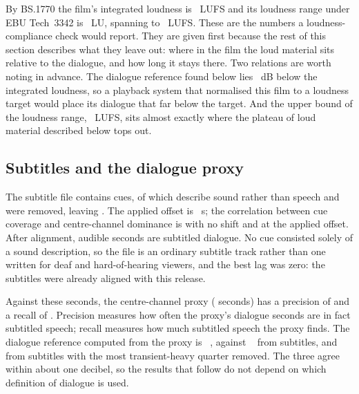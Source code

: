 By BS.1770 the film's integrated loudness is \resIntegrated~LUFS and its loudness range under EBU Tech~3342 is \resLRA~LU, spanning \resLRALow{} to \resLRAHigh~LUFS. These are the numbers a loudness-compliance check would report. They are given first because the rest of this section describes what they leave out: where in the film the loud material sits relative to the dialogue, and how long it stays there. Two relations are worth noting in advance. The dialogue reference found below lies \xDialogueBelowIntegrated~dB below the integrated loudness, so a playback system that normalised this film to a loudness target would place its dialogue that far below the target. And the upper bound of the loudness range, \resLRAHigh~LUFS, sits almost exactly where the plateau of loud material described below tops out.

\subsection{Subtitles and the dialogue proxy}

The subtitle file contains \resSubCues{} cues, of which \resSubNonspeechCues{} describe sound rather than speech and were removed, leaving \resSubSpeechCues. The applied offset is \resSubOffset~s; the correlation between cue coverage and centre-channel dominance is \resSubCorrZero{} with no shift and \resSubCorrOffset{} at the applied offset. After alignment, \resSubSeconds{} audible seconds are subtitled dialogue. No cue consisted solely of a sound description, so the file is an ordinary subtitle track rather than one written for deaf and hard-of-hearing viewers, and the best lag was zero: the subtitles were already aligned with this release.

Against these seconds, the centre-channel proxy (\resProxySeconds{} seconds) has a precision of \resProxyPrecision{} and a recall of \resProxyRecall. Precision measures how often the proxy's dialogue seconds are in fact subtitled speech; recall measures how much subtitled speech the proxy finds. The dialogue reference computed from the proxy is \resDialogueRefProxy~\resLevelUnit, against \resDialogueRefSub~\resLevelUnit{} from subtitles, and \resDialogueRefSubCapped~\resLevelUnit{} from subtitles with the most transient-heavy quarter removed. The three agree within about one decibel, so the results that follow do not depend on which definition of dialogue is used.


